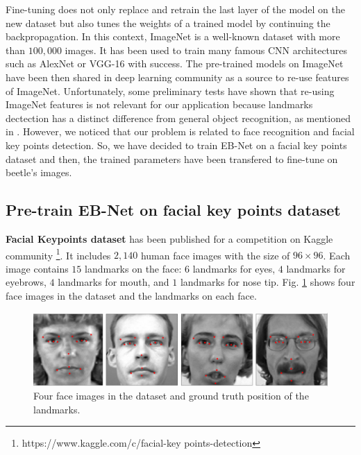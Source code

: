 \documentclass[review]{elsarticle}
\begin{document}
Fine-tuning does not only replace and retrain the last layer of the model on
the new dataset but also tunes the weights of a trained
model by continuing the backpropagation. In this context, ImageNet \cite{imagenet_cvpr09} is a well-known dataset with more than $100,000 $ images. It has been used to train many famous CNN architectures such as AlexNet \cite{krizhevsky2012imagenet} or VGG-16 \cite{simonyan2014very} with success. The pre-trained models on ImageNet have been then shared in deep learning community as a source to re-use features of ImageNet. Unfortunately, some preliminary tests have shown that re-using ImageNet features
is not relevant for our application because landmarks dectection has a distinct difference from general object recognition, as mentioned in \cite{lin2016homemade}. However, we noticed that our problem is related to face recognition and facial key points detection. So, we have decided to train EB-Net on a facial key points dataset and then, the trained parameters have been transfered to fine-tune on beetle's images.


\subsection{Pre-train EB-Net on facial key points dataset}
\textbf{Facial Keypoints dataset} has been published for a competition on Kaggle community \footnote{https://www.kaggle.com/c/facial-key points-detection}. It includes $2,140$ human face images with the size of $96 \times 96$. Each image contains $15$ landmarks on the face: $6$ landmarks for eyes, $4$ landmarks for eyebrows, $4$ landmarks for mouth, and $1$ landmarks for nose tip. Fig. \ref{figaface} shows four face images in the dataset and the landmarks on each face.

\begin{figure}[htbp]
	\centerline{\includegraphics[scale=0.16]{images/face_dataset_2.png}}
	\caption{Four face images in the dataset and ground truth position of the landmarks.}
	\label{figaface}
\end{figure}
\end{document}
